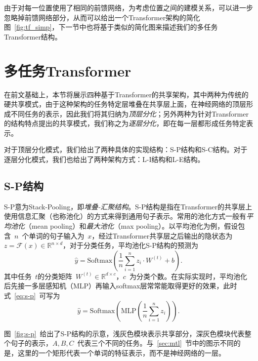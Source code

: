 由于对每一位置使用了相同的前馈网络，为考虑位置之间的建模关系，可以进一步忽略掉前馈网络部分，从而可以给出一个Transformer架构的简化图~\ref{fig:tf_simp}，下一节中也将基于类似的简化图来描述我们的多任务Transformer结构。

\section{多任务Transformer}
\label{sec:mtl_tf}
在前文基础上，本节将展示四种基于Transformer的共享架构，其中两种为传统的硬共享模式，由于这种架构的任务特定层堆叠在共享层上面，在神经网络的顶层形成不同任务的表示，因此我们将其归纳为\emph{顶层分化}；另外两种为针对Transformer的结构特点提出的共享模式，我们称之为\emph{逐层分化}，即在每一层都形成任务特定表示。

对于顶层分化模式，我们给出了两种具体的实现结构：S-P结构和S-C结构。对于逐层分化模式，我们也给出了两种架构方式：L-I结构和L-E结构。

\subsection{S-P结构}
S-P意为Stack-Pooling，即\emph{堆叠-汇聚结构}。S-P结构是指在Transformer的共享层上使用信息汇聚（也称池化）的方式来得到通用句子表示。常用的池化方式一般有\emph{平均池化}（mean pooling）和\emph{最大池化}（max pooling）。以平均池化为例，假设包含~$n$~个单词的句子输入为~$x$，经过Transformer共享层之后输出的隐状态为~$z = \mathcal{F}(x) \in \mathbb{R}^{n \times d}$，对于分类任务，平均池化S-P结构的预测为
\begin{equation}
	\hat{y} = \mathrm{Softmax}(\frac{1}{n}\sum_{i=1}^{n}z_i\cdot W^{(t)} + b).
	\label{eq:s-p}
\end{equation}
其中任务~$t$的分类矩阵~$W^{(t)}\in \mathbb{R}^{d\times c}$，$c$~为分类个数。在实际实现时，平均池化后先接一多层感知机（MLP）再输入softmax层常常能取得更好的效果，此时式~\ref{eq:s-p}~可写为
\begin{equation}
	\hat{y} = \mathrm{Softmax}(\mathrm{MLP}(\frac{1}{n}\sum_{i=1}^{n}z_i)).
\end{equation}

图~\ref{fig:s-p}~给出了S-P结构的示意，浅灰色模块表示共享部分，深灰色模块代表整个句子的表示，$A,B,C$~代表三个不同的任务。与~\ref{sec:mtl}~节中的图示不同的是，这里的一个矩形代表一个单词的特征表示，而不是神经网络的一层。

